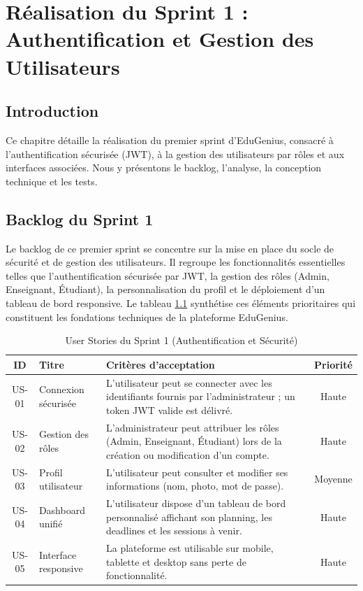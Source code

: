 \chapter{Réalisation du Sprint 1 : Authentification et Gestion des Utilisateurs}

\section*{Introduction}

Ce chapitre détaille la réalisation du premier sprint d'EduGenius, consacré à l'authentification sécurisée (JWT), à la gestion des utilisateurs par rôles et aux interfaces associées. Nous y présentons le backlog, l'analyse, la conception technique et les tests.

\section{Backlog du Sprint 1}

Le backlog de ce premier sprint se concentre sur la mise en place du socle de sécurité et de gestion des utilisateurs. Il regroupe les fonctionnalités essentielles telles que l'authentification sécurisée par JWT, la gestion des rôles (Admin, Enseignant, Étudiant), la personnalisation du profil et le déploiement d'un tableau de bord responsive. Le tableau \ref{tab:sprint1_backlog} synthétise ces éléments prioritaires qui constituent les fondations techniques de la plateforme EduGenius.

\begin{table}[H]
\centering
\small
\begin{tabularx}{\textwidth}{|c|>{\raggedright\arraybackslash}p{4cm}|X|c|}
\hline
\textbf{ID} & \textbf{Titre} & \textbf{Critères d’acceptation} & \textbf{Priorité} \\
\hline
US-01 & Connexion sécurisée & L'utilisateur peut se connecter avec les identifiants fournis par l'administrateur ; un token JWT valide est délivré. & Haute \\
\hline
US-02 & Gestion des rôles & L'administrateur peut attribuer les rôles (Admin, Enseignant, Étudiant) lors de la création ou modification d'un compte. & Haute \\
\hline
US-03 & Profil utilisateur & L'utilisateur peut consulter et modifier ses informations (nom, photo, mot de passe). & Moyenne \\
\hline
US-04 & Dashboard unifié & L'utilisateur dispose d'un tableau de bord personnalisé affichant son planning, les deadlines et les sessions à venir. & Haute \\
\hline
US-05 & Interface responsive & La plateforme est utilisable sur mobile, tablette et desktop sans perte de fonctionnalité. & Haute \\
\hline
\end{tabularx}
\caption{User Stories du Sprint 1 (Authentification et Sécurité)}
\label{tab:sprint1_backlog}
\end{table}

